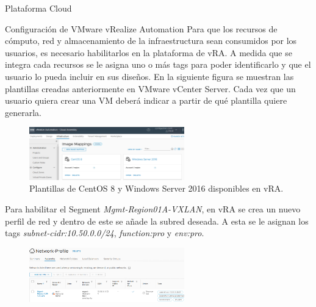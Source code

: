 \begin{subsection}{Plataforma Cloud}
    \begin{subsubsection}{Configuración de VMware vRealize Automation}
        Para que los recursos de cómputo, red y almacenamiento de la infraestructura sean consumidos por los usuarios, es necesario habilitarlos en la plataforma de vRA. A medida que se integra cada recursos se le asigna uno o más tags para poder identificarlo y que el usuario lo pueda incluir en sus diseños. 
        En la siguiente figura se muestran las plantillas creadas anteriormente en VMware vCenter Server. Cada vez que un usuario quiera crear una VM deberá indicar a partir de qué plantilla quiere generarla.
        \begin{figure}[h]
            \centering
            \includegraphics[width=0.6\textwidth]{imaxes/pruebaconcepto/vrealize/image-mappings.png}
            \caption{Plantillas de CentOS 8 y Windows Server 2016 disponibles en vRA.}
            \label{fig:image-mapping}
        \end{figure}
        \FloatBarrier
        Para habilitar el Segment \textit{Mgmt-Region01A-VXLAN}, en vRA se crea un nuevo perfil de red y dentro de este se añade la subred deseada. A esta se le asignan los tags \textit{subnet-cidr:10.50.0.0/24}, \textit{function:pro} y \textit{env:pro}.
        \begin{figure}[h]
            \centering
            \includegraphics[width=0.6\textwidth]{imaxes/pruebaconcepto/vrealize/net-profile-MGMT.png}

\end{figure}
\end{subsubsection}
\end{subsection}
